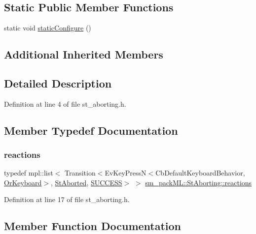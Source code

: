 \subsection*{Static Public Member Functions}
\begin{DoxyCompactItemize}
\item 
static void \hyperlink{structsm__packML_1_1StAborting_a5aee0e07b9d76338736e549f39e6784a}{static\+Configure} ()
\end{DoxyCompactItemize}
\subsection*{Additional Inherited Members}


\subsection{Detailed Description}


Definition at line 4 of file st\+\_\+aborting.\+h.



\subsection{Member Typedef Documentation}
\mbox{\label{structsm__packML_1_1StAborting_a45895613faad478b7cdbab9f0b8cb7aa}} 
\subsubsection{\texorpdfstring{reactions}{reactions}}
{\footnotesize\ttfamily typedef mpl\+::list$<$ Transition$<$Ev\+Key\+PressN$<$Cb\+Default\+Keyboard\+Behavior, \hyperlink{classsm__packML_1_1OrKeyboard}{Or\+Keyboard}$>$, \hyperlink{structsm__packML_1_1StAborted}{St\+Aborted}, \hyperlink{classSUCCESS}{S\+U\+C\+C\+E\+SS}$>$ $>$ \hyperlink{structsm__packML_1_1StAborting_a45895613faad478b7cdbab9f0b8cb7aa}{sm\+\_\+pack\+M\+L\+::\+St\+Aborting\+::reactions}}



Definition at line 17 of file st\+\_\+aborting.\+h.



\subsection{Member Function Documentation}
\mbox{\label{structsm__packML_1_1StAborting_a64d1081ac0e6f4ee49e12cc80eda621b}} 
